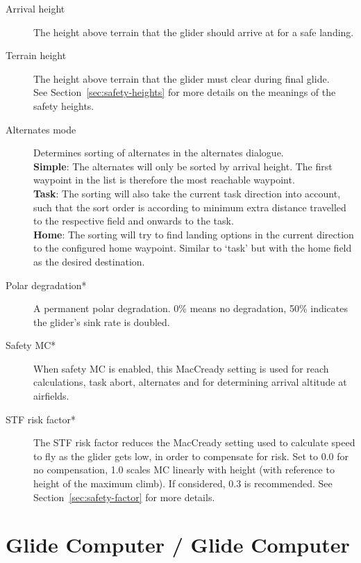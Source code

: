 \begin{description}
\item[Arrival height]  The height above terrain that the glider
  should arrive at for a safe landing.
\item[Terrain height]  \label{conf:safetyterrain} The height above terrain that 
  the glider must clear during final glide. \\
See Section~\ref{sec:safety-heights} for more details on the meanings
of the safety heights. \\
\item[Alternates mode]  \label{conf:alternatesmode} Determines sorting of alternates 
  in the alternates dialogue. \\
  {\bf Simple}: The alternates will only be sorted by arrival height. 
    The first waypoint in the list is therefore the most reachable waypoint. \\
  {\bf Task}: The sorting will also take the current task direction into account, 
    such that the sort order is according to minimum extra distance travelled to 
    the respective field and onwards to the task. \\
  {\bf Home}: The sorting will try to find landing options in the current direction 
    to the configured home waypoint.  Similar to `task' but with 
    the home field as the desired destination.
\item[Polar degradation*]  A permanent polar degradation. 0\% means no degradation, 
  50\% indicates the glider's sink rate is doubled.
\item[Safety MC*]  When safety MC is enabled, this MacCready setting is used for reach 
  calculations, task abort, alternates and for determining arrival altitude at airfields. 
\item[STF risk factor*] 
  The STF risk factor reduces the MacCready setting used to calculate
  speed to fly as the glider gets low, in order to compensate for
  risk.  Set to 0.0 for no compensation, 1.0 scales MC linearly with
  height (with reference to height of the maximum climb). If considered, 0.3 is recommended.  
  See Section~\ref{sec:safety-factor} for more details.
\end{description}


\section{Glide Computer / Glide Computer}\label{sec:final-glide}

